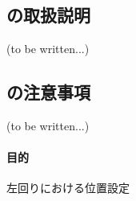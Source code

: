 \subsection{\KCurvedOutcutRLeft の取扱説明\TBW}
(to be written...)


\subsection{\KCurvedOutcutRLeft の注意事項\TBW}
(to be written...)



\clearpage

\paragraph*{目的}
左回り\KeywayMilling における位置設定


\subsection{\KKeywayConerLeftArguments}


